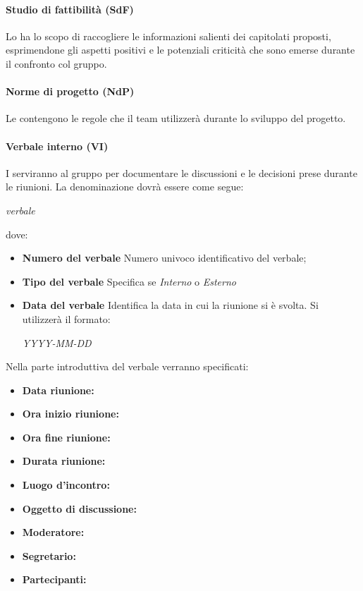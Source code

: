 	\paragraph{Studio di fattibilità (SdF)}
	Lo \SdF{} ha lo scopo di raccogliere le informazioni salienti dei capitolati proposti, esprimendone gli aspetti positivi e le potenziali criticità che sono emerse durante il confronto col gruppo.
	\paragraph{Norme di progetto (NdP)}
	Le \NdP{} contengono le regole che il team utilizzerà durante lo sviluppo del progetto.
	\paragraph{Verbale interno (VI)}
	I \VI{} serviranno al gruppo per documentare le discussioni e le decisioni prese durante le riunioni. La denominazione dovrà essere come segue:\\
	\begin{center}
		\textit{verbale} 
	\end{center}
	dove:
	\begin{itemize}
		\item \textbf{Numero del verbale}
		Numero univoco identificativo del verbale;
		\item \textbf{Tipo del verbale}
		Specifica se \emph{Interno} o \emph{Esterno}
		\item \textbf{Data del verbale}
		Identifica la data in cui la riunione si è svolta. Si utilizzerà il formato:
		\begin{center}
			\emph{YYYY-MM-DD}
		\end{center}
	\end{itemize}
	Nella parte introduttiva del verbale verranno specificati:
	\begin{itemize}
		\item \textbf{Data riunione:}
		\item \textbf{Ora inizio riunione:}
		\item \textbf{Ora fine riunione:}
		\item \textbf{Durata riunione:}
		\item \textbf{Luogo d'incontro:}
		\item \textbf{Oggetto di discussione:}
		\item \textbf{Moderatore:}
		\item \textbf{Segretario:}
		\item \textbf{Partecipanti:}
	\end{itemize}
	
